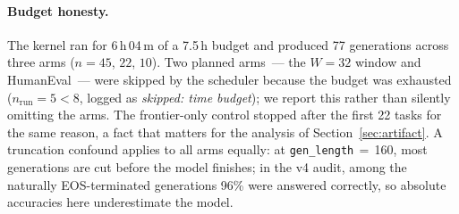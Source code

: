 \paragraph{Budget honesty.}
The kernel ran for 6\,h\,04\,m of a 7.5\,h budget and produced 77 generations
across three arms ($n{=}45$, $22$, $10$). Two planned arms~--- the $W{=}32$ window
and HumanEval~--- were skipped by the scheduler because the budget was exhausted
($n_{\mathrm{run}}{=}5 < 8$, logged as \emph{skipped: time budget}); we report
this rather than silently omitting the arms. The frontier-only control stopped
after the first 22 tasks for the same reason, a fact that matters for the analysis
of Section~\ref{sec:artifact}. A truncation confound applies to all arms equally:
at \texttt{gen\_length}$\,{=}\,$160, most generations are cut before the model
finishes; in the v4 audit, among the naturally EOS-terminated generations 96\%
were answered correctly, so absolute accuracies here underestimate the model.
